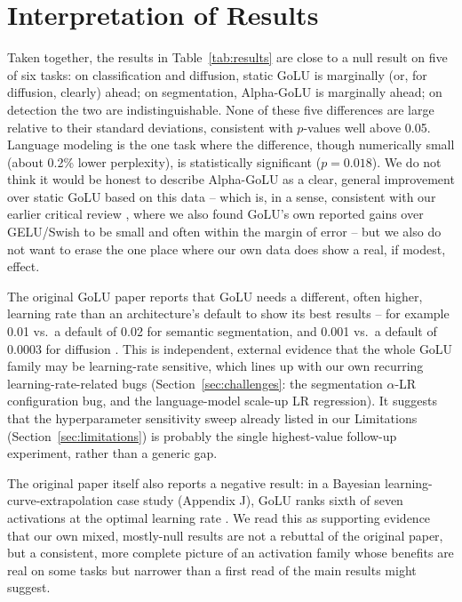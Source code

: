 \documentclass[conference]{IEEEtran}
\begin{document}
\section{Interpretation of Results}

Taken together, the results in Table~\ref{tab:results} are close to a null result on five of six tasks: on classification and diffusion, static GoLU is marginally (or, for diffusion, clearly) ahead; on segmentation, Alpha-GoLU is marginally ahead; on detection the two are indistinguishable. None of these five differences are large relative to their standard deviations, consistent with $p$-values well above 0.05. Language modeling is the one task where the difference, though numerically small (about 0.2\% lower perplexity), is statistically significant ($p=0.018$). We do not think it would be honest to describe Alpha-GoLU as a clear, general improvement over static GoLU based on this data -- which is, in a sense, consistent with our earlier critical review \cite{kopic2026critical}, where we also found GoLU's own reported gains over GELU/Swish to be small and often within the margin of error -- but we also do not want to erase the one place where our own data does show a real, if modest, effect.

The original GoLU paper reports that GoLU needs a different, often higher, learning rate than an architecture's default to show its best results -- for example 0.01 vs.\ a default of 0.02 for semantic segmentation, and 0.001 vs.\ a default of 0.0003 for diffusion \cite{golu2025}. This is independent, external evidence that the whole GoLU family may be learning-rate sensitive, which lines up with our own recurring learning-rate-related bugs (Section~\ref{sec:challenges}: the segmentation $\alpha$-LR configuration bug, and the language-model scale-up LR regression). It suggests that the hyperparameter sensitivity sweep already listed in our Limitations (Section~\ref{sec:limitations}) is probably the single highest-value follow-up experiment, rather than a generic gap.

The original paper itself also reports a negative result: in a Bayesian learning-curve-extrapolation case study (Appendix J), GoLU ranks sixth of seven activations at the optimal learning rate \cite{golu2025}. We read this as supporting evidence that our own mixed, mostly-null results are not a rebuttal of the original paper, but a consistent, more complete picture of an activation family whose benefits are real on some tasks but narrower than a first read of the main results might suggest.
\end{document}
